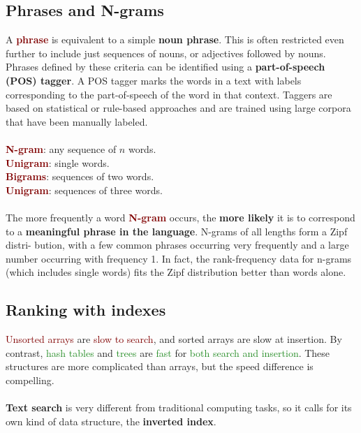 \subsection{Phrases and N-grams}
A \textbf{\textcolor{Maroon}{phrase}} is equivalent to a simple \textbf{noun phrase}. This is often restricted even further to include just sequences of nouns, or adjectives followed by nouns. Phrases defined by these criteria can be identified using a \textbf{\textcolor{PineGreen}{part-of-speech (POS) tagger}}. A POS tagger marks the words in a text with labels corresponding to the part-of-speech of the word in that context. Taggers are based on statistical or rule-based approaches and are trained using large corpora that have been manually labeled.
\\
\\
\textbf{\textcolor{Maroon}{N-gram}}: any sequence of $n$ words. \\
\textbf{\textcolor{Maroon}{Unigram}}: single words. \\
\textbf{\textcolor{Maroon}{Bigrams}}: sequences of two words. \\
\textbf{\textcolor{Maroon}{Unigram}}: sequences of three words. \\
\\
The more frequently a word \textbf{\textcolor{Maroon}{N-gram}} occurs, the \textbf{more likely} it is to correspond to a \textbf{meaningful phrase in the language}. N-grams of all lengths form a Zipf distri- bution, with a few common phrases occurring very frequently and a large number occurring with frequency 1. In fact, the rank-frequency data for n-grams (which includes single words) fits the Zipf distribution better than words alone. 

\subsection{Ranking with indexes}
\textcolor{Maroon}{Unsorted arrays} are \textcolor{Maroon}{slow to search}, and \textcolor{RubineRed}{sorted arrays} are \textcolor{RubineRed}{slow at insertion}. By contrast, \textcolor{ForestGreen}{hash tables} and \textcolor{ForestGreen}{trees} are \textcolor{ForestGreen}{fast} for \textcolor{ForestGreen}{both search and insertion}. These structures are more complicated than arrays, but the speed difference is compelling.
\\
\\
\textbf{\textcolor{PineGreen}{Text search}} is very different from traditional computing tasks, so it calls for its own kind of data structure, the \textbf{\textcolor{BlueGreen}{inverted index}}.

